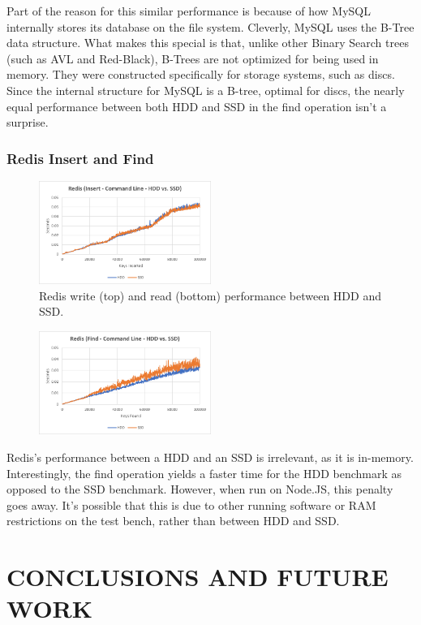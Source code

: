 \documentclass[letterpaper, 10 pt, conference]{ieeeconf}
\begin{document}
Part of the reason for this similar performance is because of how MySQL internally stores its database on the file system. Cleverly, MySQL uses the B-Tree data structure. What makes this special is that, unlike other Binary Search trees (such as AVL and Red-Black), B-Trees are not optimized for being used in memory. They were constructed specifically for storage systems, such as discs. Since the internal structure for MySQL is a B-tree, optimal for discs, the nearly equal performance between both HDD and SSD in the find operation isn't a surprise.
\subsubsection{Redis Insert and Find}
\begin{figure}[h]
    \centering
    \includegraphics[width=0.5\textwidth]{7.png}
        \caption{Redis write (top) and read (bottom) performance between HDD and SSD.}
    \label{fig:mesh1}
\end{figure}
\begin{figure}[h]
    \centering
    \includegraphics[width=0.5\textwidth]{8.png}
    \label{fig:mesh1}
\end{figure}
Redis's performance between a HDD and an SSD is irrelevant, as it is in-memory. Interestingly, the find operation yields a faster time for the HDD benchmark as opposed to the SSD benchmark. However, when run on Node.JS, this penalty goes away. It's possible that this is due to other running software or RAM restrictions on the test bench, rather than between HDD and SSD.
\section{CONCLUSIONS AND FUTURE WORK}
\end{document}
